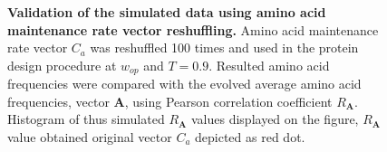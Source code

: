 \documentclass{report}
\begin{document}
\begin{figure}[h!]
	\centering
	\qquad
	\caption{
	{\bf Validation of the simulated data using amino acid maintenance rate vector reshuffling.} Amino acid maintenance rate vector $C_{a}$ was reshuffled 100 times and used in the protein design procedure at $\mathit{w}_{op}$ and $T=0.9$. Resulted amino acid frequencies were compared with the evolved average amino acid frequencies, vector $\mathbf{A}$, using Pearson correlation coefficient $R_{\mathbf{A}}$. Histogram of thus simulated $R_{\mathbf{A}}$ values displayed on the figure, $R_{\mathbf{A}}$ value obtained original vector $C_{a}$ depicted as red dot.
}
\end{figure}





%
%
\end{document}
